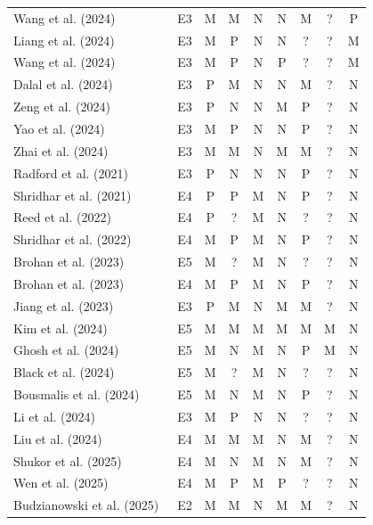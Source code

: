 \documentclass[10pt,a4paper]{article}
\begin{document}
\begin{longtable}{@{}>{\raggedright\arraybackslash}p{5.5cm}cccccccc@{}}
Wang et al. (2024)~\cite{Wang2024a} & E3 & M & M & N & N & M & ? & P \\
Liang et al. (2024)~\cite{Liang2024} & E3 & M & P & N & N & ? & ? & M \\
Wang et al. (2024)~\cite{Wang2024c} & E3 & M & P & N & P & ? & ? & M \\
Dalal et al. (2024)~\cite{Dalal2024} & E3 & P & M & N & N & M & ? & N \\
Zeng et al. (2024)~\cite{Zeng2024} & E3 & P & N & N & M & P & ? & N \\
Yao et al. (2024)~\cite{Yao2024} & E3 & M & P & N & N & P & ? & N \\
Zhai et al. (2024)~\cite{Zhai2024} & E3 & M & M & N & M & M & ? & N \\
Radford et al. (2021)~\cite{Radford2021} & E3 & P & N & N & N & P & ? & N \\
Shridhar et al. (2021)~\cite{Shridhar2021} & E4 & P & P & M & N & P & ? & N \\
Reed et al. (2022)~\cite{Reed2022} & E4 & P & ? & M & N & ? & ? & N \\
Shridhar et al. (2022)~\cite{Shridhar2022} & E4 & M & P & M & N & P & ? & N \\
Brohan et al. (2023)~\cite{Brohan2023a} & E5 & M & ? & M & N & ? & ? & N \\
Brohan et al. (2023)~\cite{Brohan2023b} & E4 & M & P & M & N & P & ? & N \\
Jiang et al. (2023)~\cite{Jiang2023} & E3 & P & M & N & M & M & ? & N \\
Kim et al. (2024)~\cite{Kim2024} & E5 & M & M & M & M & M & M & N \\
Ghosh et al. (2024)~\cite{Octo2024} & E5 & M & N & M & N & P & M & N \\
Black et al. (2024)~\cite{Black2024} & E5 & M & ? & M & N & ? & ? & N \\
Bousmalis et al. (2024)~\cite{Bousmalis2023} & E5 & M & N & M & N & P & ? & N \\
Li et al. (2024)~\cite{Li2024a} & E3 & M & P & N & N & ? & ? & N \\
Liu et al. (2024)~\cite{Liu2024a} & E4 & M & M & M & N & M & ? & N \\
Shukor et al. (2025)~\cite{Shukor2025} & E4 & M & N & M & N & M & ? & N \\
Wen et al. (2025)~\cite{Wen2025} & E4 & M & P & M & P & ? & ? & N \\
Budzianowski et al. (2025)~\cite{Budzianowski2025} & E2 & M & M & N & M & M & ? & N \\

\end{longtable}
\end{document}
